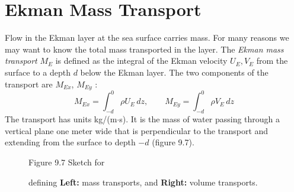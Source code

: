 \section{Ekman Mass Transport}
 Flow in the
Ekman layer at the sea surface carries mass. For many reasons we may
want to know the total mass transported in the layer. The
\textit{Ekman mass transport} $M_E$ is defined as the integral of the
Ekman velocity $U_E, V_E$ from the surface to a depth $d$ below the
Ekman layer. The two components of the transport are $M_{Ex}$,
$M_{Ey}$ :
\begin{equation}
M_{Ex} = \int^0_{-d} \rho U_E \, dz, \qquad
M_{Ey} = \int^0_{-d} \rho V_E \, dz
\end{equation}
The transport has units kg/(m$\cdot$s). It is the mass of water
passing through a vertical plane one meter wide that is perpendicular
to the transport and extending from the surface to depth $-d$ (figure 9.7).

\begin{figure}[h!]
\vspace{-2ex}
\centering
\footnotesize
Figure 9.7 Sketch for \rule{0mm}{3ex}defining \textbf{Left:} mass
transports, and \textbf{Right:} volume
transports.
\label{fig:transportsketch}
\end{figure}

